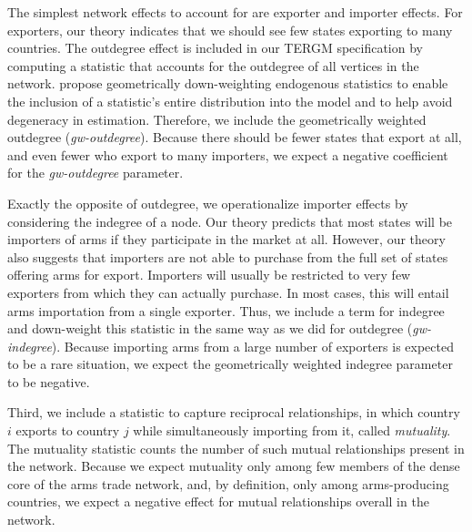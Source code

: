\documentclass[12pt, letterpaper]{article}
\numberwithin{equation}{section}
\begin{document}
The simplest network effects to account for are exporter and importer effects. 
For exporters, our theory indicates that we should see few states exporting to many countries. 
The outdegree effect is included in our TERGM specification by computing a statistic that accounts for the outdegree of all vertices in the network. 
\citet{HunHan:06} propose geometrically down-weighting endogenous statistics to enable the inclusion of a statistic's entire distribution into the model and to help avoid degeneracy in estimation. 
Therefore, we include the geometrically weighted outdegree (\emph{gw-outdegree}). 
Because there should be fewer states that export at all, and even fewer who export to many importers, we expect a negative coefficient for the \emph{gw-outdegree} parameter. 

Exactly the opposite of outdegree, we operationalize importer effects by considering the indegree of a node. 
Our theory predicts that most states will be importers of arms if they participate in the market at all. 
However, our theory also suggests that importers are not able to purchase from the full set of states offering arms for export. 
Importers will usually be restricted to very few exporters from which they can actually purchase. 
In most cases, this will entail arms importation from a single exporter. 
Thus, we include a term for indegree and down-weight this statistic in the same way as we did for outdegree (\emph{gw-indegree}). 
Because importing arms from a large number of exporters is expected to be a rare situation, we expect the geometrically weighted indegree parameter to be negative.


Third, we include a statistic to capture reciprocal relationships, in which country $i$ exports to country $j$ while simultaneously importing from it, called \emph{mutuality}. 
The mutuality statistic counts the number of such mutual relationships present in the network. 
Because we expect mutuality only among few members of the dense core of the arms trade network, and, by definition, only among arms-producing countries, we expect a negative effect for mutual relationships overall in the network. 
\end{document}
